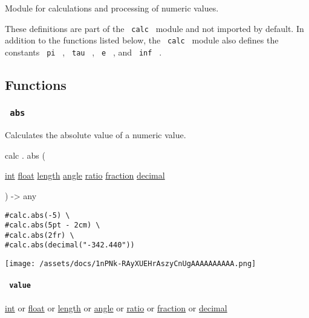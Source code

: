 Module for calculations and processing of numeric values.

These definitions are part of the \texttt{\ calc\ } module and not
imported by default. In addition to the functions listed below, the
\texttt{\ calc\ } module also defines the constants \texttt{\ pi\ } ,
\texttt{\ tau\ } , \texttt{\ e\ } , and \texttt{\ inf\ } .

\subsection{Functions}\label{functions}

\subsubsection{\texorpdfstring{\texttt{\ abs\ }}{ abs }}\label{functions-abs}

Calculates the absolute value of a numeric value.

calc { . } { abs } (

{ \href{/docs/reference/foundations/int/}{int}
\href{/docs/reference/foundations/float/}{float}
\href{/docs/reference/layout/length/}{length}
\href{/docs/reference/layout/angle/}{angle}
\href{/docs/reference/layout/ratio/}{ratio}
\href{/docs/reference/layout/fraction/}{fraction}
\href{/docs/reference/foundations/decimal/}{decimal} }

) -\textgreater{} { any }

\begin{verbatim}
#calc.abs(-5) \
#calc.abs(5pt - 2cm) \
#calc.abs(2fr) \
#calc.abs(decimal("-342.440"))
\end{verbatim}

\texttt{[image: /assets/docs/1nPNk-RAyXUEHrAszyCnUgAAAAAAAAAA.png]}

\paragraph{\texorpdfstring{\texttt{\ value\ }}{ value }}\label{functions-abs-value}

\href{/docs/reference/foundations/int/}{int} {or}
\href{/docs/reference/foundations/float/}{float} {or}
\href{/docs/reference/layout/length/}{length} {or}
\href{/docs/reference/layout/angle/}{angle} {or}
\href{/docs/reference/layout/ratio/}{ratio} {or}
\href{/docs/reference/layout/fraction/}{fraction} {or}
\href{/docs/reference/foundations/decimal/}{decimal}

